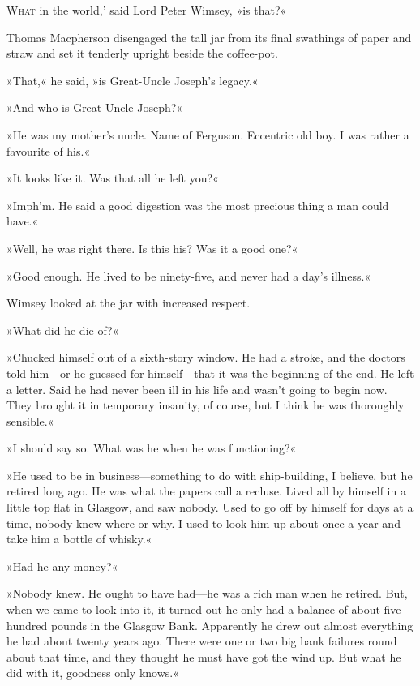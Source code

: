 
\lettrine[lines=4,ante=‘]{W}{hat} in the world,' said Lord Peter Wimsey, »is that?«

\zz
Thomas Macpherson disengaged the tall jar from its final swathings of paper and straw and set it tenderly upright beside the coffee-pot.

»That,« he said, »is Great-Uncle Joseph's legacy.«

»And who is Great-Uncle Joseph?«

»He was my mother's uncle. Name of Ferguson. Eccentric old boy. I was rather a favourite of his.«

»It looks like it. Was that all he left you?«

»Imph'm. He said a good digestion was the most precious thing a man could have.«

»Well, he was right there. Is this his? Was it a good one?«

»Good enough. He lived to be ninety-five, and never had a day's illness.«

Wimsey looked at the jar with increased respect.

»What did he die of?«

»Chucked himself out of a sixth-story window. He had a stroke, and the doctors told him—or he guessed for himself—that it was the beginning of the end. He left a letter. Said he had never been ill in his life and wasn't going to begin now. They brought it in temporary insanity, of course, but I think he was thoroughly sensible.«

»I should say so. What was he when he was functioning?«

»He used to be in business—something to do with ship-building, I believe, but he retired long ago. He was what the papers call a recluse. Lived all by himself in a little top flat in Glasgow, and saw nobody. Used to go off by himself for days at a time, nobody knew where or why. I used to look him up about once a year and take him a bottle of whisky.«

»Had he any money?«

»Nobody knew. He ought to have had—he was a rich man when he retired. But, when we came to look into it, it turned out he only had a balance of about five hundred pounds in the Glasgow Bank. Apparently he drew out almost everything he had about twenty years ago. There were one or two big bank failures round about that time, and they thought he must have got the wind up. But what he did with it, goodness only knows.«

